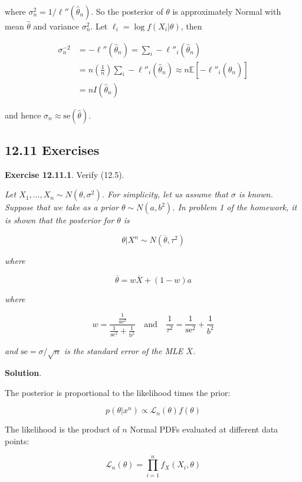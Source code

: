 where \(\sigma_{n}^{2} = 1 / \ell''(\hat{\theta}_{n})\). So the posterior of
\(\theta\) is approximately Normal with mean \(\hat{\theta}\) and
variance \(\sigma^{2}_{n}\). Let \(\ell_{i} = \log f(X_{i} | \theta)\), then

\begin{align*}
\sigma_{n}^{-2} &= -\ell''(\hat{\theta}_{n}) = \sum_{i} -\ell''_{i}(\hat{\theta}_{n}) \\
&= n \left( \frac{1}{n} \right) \sum_{i} -\ell''_{i}(\hat{\theta}_{n}) \approx n \mathbb{E}\left[-\ell''_{i}(\hat{\theta}_{n})\right] \\
&= n I(\hat{\theta}_{n})
\end{align*}

and hence \(\sigma_{n} \approx \text{se}(\hat{\theta})\).

\subsection*{12.11 Exercises}

\textbf{Exercise 12.11.1}. Verify (12.5).

\emph{Let \(X_{1}, \dots, X_{n} \sim N(\theta, \sigma^{2})\). For simplicity,
let us assume that \(\sigma\) is known. Suppose that we take as a prior
\(\theta \sim N(a, b^{2})\). In problem 1 of the homework, it is shown
that the posterior for \(\theta\) is}

\[\theta | X^{n} \sim N(\overline{\theta}, \tau^{2})\]

\emph{where}

\[\overline{\theta} = w \overline{X} + (1 - w) a\]

\emph{where}

\[w = \frac{\frac{1}{\text{se}^{2}}}{\frac{1}{\text{se}^{2}} + \frac{1}{\text{b}^{2}}} \quad \text{and} \quad \frac{1}{\tau^{2}} = \frac{1}{\text{se}^{2}} + \frac{1}{b^{2}}\]

\emph{and \(\text{se} = \sigma / \sqrt{n}\) is the standard error of the
MLE \(\overline{X}\).}

\textbf{Solution}.

The posterior is proportional to the likelihood times the prior:

\[ p(\theta | x^{n}) \propto \mathcal{L}_{n}(\theta) f(\theta)\]

The likelihood is the product of \(n\) Normal PDFs evaluated at
different data points:

\[ 
\mathcal{L}_{n}(\theta) = \prod_{i=1}^{n} f_X(X_{i}, \theta)
\]

